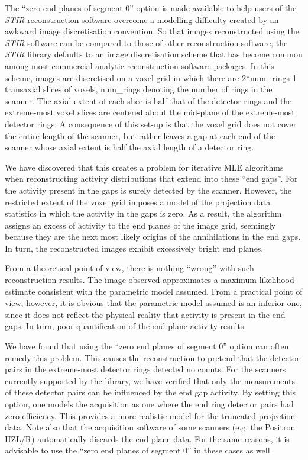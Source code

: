 \documentclass{article}
\begin{document}
The ``zero end planes of segment 0'' option is made available 
to help users of the \textit{STIR} reconstruction software overcome 
a modelling difficulty created by an awkward image discretisation 
convention. So that images reconstructed using the \textit{STIR} software 
can be compared to those of other reconstruction software, the \textit{STIR} 
library defaults to an image discretisation scheme that has become 
common among most commercial analytic reconstruction software 
packages. In this scheme, images are discretised on a voxel grid 
in which there are 2*num\_rings-1 transaxial slices of voxels, 
num\_rings denoting the number of rings in the scanner. The axial 
extent of each slice is half that of the detector rings and the 
extreme-most voxel slices are centered about the mid-plane of 
the extreme-most detector rings. A consequence of this set-up 
is that the voxel grid does not cover the entire length of the 
scanner, but rather leaves a gap at each end of the scanner whose 
axial extent is half the axial length of a detector ring.



We have discovered that this creates a problem for iterative 
MLE algorithms when reconstructing activity distributions that 
extend into these ``end gaps''. For the activity present in the 
gaps is surely detected by the scanner. However, the restricted 
extent of the voxel grid imposes a model of the projection data 
statistics in which the activity in the gaps is zero. As a result, 
the algorithm assigns an excess of activity to the end planes 
of the image grid, seemingly because they are the next most likely 
origins of the annihilations in the end gaps. In turn, the reconstructed 
images exhibit excessively bright end planes.



From a theoretical point of view, there is nothing ``wrong'' with 
such reconstruction results. The image observed approximates 
a maximum likelihood estimate consistent with the parametric 
model assumed. From a practical point of view, however, it is 
obvious that the parametric model assumed is an inferior one, 
since it does not reflect the physical reality that activity 
is present in the end gaps. In turn, poor quantification of the 
end plane activity results. 



We have found that using the ``zero end planes of segment 0'' 
option can often remedy this problem. This causes the reconstruction 
to pretend that the detector pairs in the extreme-most detector 
rings detected no counts. For the scanners currently supported 
by the library, we have verified that only the measurements of 
these detector pairs can be influenced by the end gap activity. 
By setting this option, one models 
the acquisition as one where the end ring detector pairs had 
zero efficiency. This provides a more realistic model for the 
truncated projection data. Note also that the acquisition software 
of some scanners (e.g. the Positron HZL/R) automatically discards 
the end plane data. For the same reasons, it is advisable to 
use the ``zero end planes of segment 0'' in these cases as well.
\end{document}
